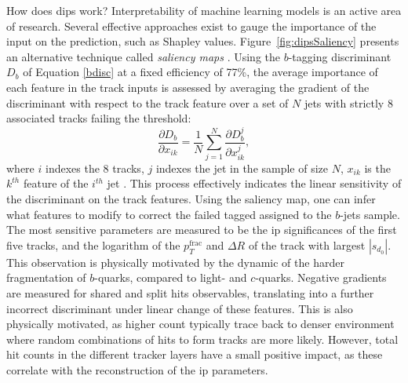 How does \gls{dips} work? Interpretability of machine learning models is an active area of research. Several effective approaches exist to gauge the importance of the input on the prediction, such as Shapley values. Figure~\ref{fig:dipsSaliency} presents an alternative technique called \textit{saliency maps} \cite{Simonyan2013DeepIC}. Using the $b$-tagging discriminant $D_b$ of Equation \ref{bdisc} at a fixed efficiency of 77\%, the average importance of each feature in the track inputs is assessed by averaging the gradient of the discriminant with respect to the track feature over a set of $N$ jets with strictly 8 associated tracks failing the threshold:
\begin{equation}
  \frac{\partial D_b}{\partial x_{ik}} = \frac{1}{N} \sum_{j=1}^N \frac{\partial D_b^{j}}{\partial x_{ik}^{j}},
\end{equation} 
where $i$ indexes the 8 tracks, $j$ indexes the jet in the sample of size $N$, $x_{ik}$ is the $k^{th}$ feature of the $i^{th}$ jet \cite{ATL-PHYS-PUB-2020-014}. This process effectively indicates the linear sensitivity of the discriminant on the track features. Using the saliency map, one can infer what features to modify to correct the failed tagged assigned to the $b$-jets sample. The most sensitive parameters are measured to be the \gls{ip} significances of the first five tracks, and the logarithm of the $p_T^{\textrm{frac}}$ and $\Delta R$ of the track with largest $|s_{d_0}|$. This observation is physically motivated by the dynamic of the harder fragmentation of $b$-quarks, compared to light- and $c$-quarks. Negative gradients are measured for shared and split hits observables, translating into a further incorrect discriminant under linear change of these features. This is also physically motivated, as higher count typically trace back to denser environment where random combinations of hits to form tracks are more likely. However, total hit counts in the different tracker layers have a small positive impact, as these correlate with the reconstruction of the \gls{ip} parameters.

